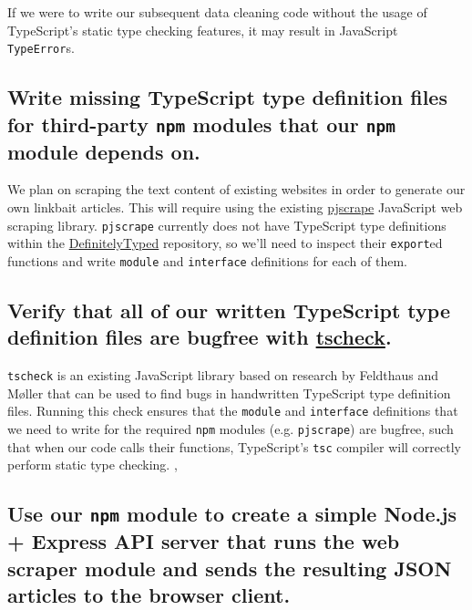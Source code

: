 \documentclass[]{article}
\begin{document}
If we were to write our subsequent data cleaning code without the usage
of TypeScript's static type checking features, it may result in
JavaScript \texttt{TypeError}s.

\subsection{Write missing TypeScript type definition files for
third-party \texttt{npm} modules that our \texttt{npm} module depends
on.}\label{write-missing-typescript-type-definition-files-for-third-party-npm-modules-that-our-npm-module-depends-on.}

We plan on scraping the text content of existing websites in order to
generate our own linkbait articles. This will require using the existing
\href{https://github.com/nrabinowitz/pjscrape}{pjscrape}
\cite{ref5} JavaScript web scraping library.
\texttt{pjscrape} currently does not have TypeScript type definitions
within the
\href{https://github.com/DefinitelyTyped/DefinitelyTyped}{DefinitelyTyped}
\cite{ref6} repository, so we'll need to inspect their
\texttt{export}ed functions and write \texttt{module} and
\texttt{interface} definitions for each of them.

\subsection{Verify that all of our written TypeScript type definition
files are bugfree with
\href{https://github.com/asgerf/tscheck}{tscheck}.}\label{verify-that-all-of-our-written-typescript-type-definition-files-are-bugfree-with-tscheck.}

\texttt{tscheck} is an existing JavaScript library based on research by
Feldthaus and Møller that can be used to find bugs in handwritten
TypeScript type definition files. Running this check ensures that the
\texttt{module} and \texttt{interface} definitions that we need to write
for the required \texttt{npm} modules (e.g. \texttt{pjscrape}) are
bugfree, such that when our code calls their functions, TypeScript's
\texttt{tsc} compiler will correctly perform static type checking.
\cite{ref1}, \cite{ref7}

\subsection{Use our \texttt{npm} module to create a simple Node.js +
Express API server that runs the web scraper module and sends the
resulting JSON articles to the browser
client.}\label{use-our-npm-module-to-create-a-simple-node.js-express-api-server-that-runs-the-web-scraper-module-and-sends-the-resulting-json-articles-to-the-browser-client.}
\end{document}
